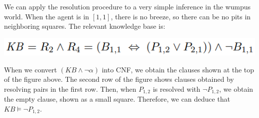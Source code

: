 We can apply the resolution procedure to a very simple inference in the wumpus world. When the agent is in $[1,1]$, there is no breeze, so there can be no pits in neighboring squares. The relevant knowledge base is:
\begin{center}
    \includegraphics[]{images/wumpus-kb.png}
\end{center}
When we convert $(KB \land \neg{\alpha})$ into CNF, we obtain the clauses shown at the top of the figure above. The second row of the figure shows clauses obtained by resolving pairs in the first row. Then, when $P_{1,2}$ is resolved with $\neg{P_{1,2}}$, we obtain the empty clause, shown as a small square. Therefore, we can deduce that $KB \vDash \neg{P_{1,2}}$.

